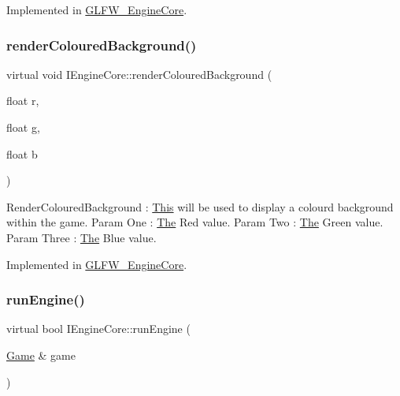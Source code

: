 Implemented in \mbox{\hyperlink{class_g_l_f_w___engine_core_aa786131ec64e7ee6779c3ac1ee8507ce}{G\+L\+F\+W\+\_\+\+Engine\+Core}}.

\mbox{\label{class_i_engine_core_a8f8e0778f04c50b680cdde167cb38e2f}} 
\subsubsection{\texorpdfstring{render\+Coloured\+Background()}{renderColouredBackground()}}
{\footnotesize\ttfamily virtual void I\+Engine\+Core\+::render\+Coloured\+Background (\begin{DoxyParamCaption}\item[{float}]{r,  }\item[{float}]{g,  }\item[{float}]{b }\end{DoxyParamCaption})\hspace{0.3cm}{\ttfamily [pure virtual]}}

Render\+Coloured\+Background \+: \mbox{\hyperlink{class_this}{This}} will be used to display a colourd background within the game. Param One \+: \mbox{\hyperlink{class_the}{The}} Red value. Param Two \+: \mbox{\hyperlink{class_the}{The}} Green value. Param Three \+: \mbox{\hyperlink{class_the}{The}} Blue value. 

Implemented in \mbox{\hyperlink{class_g_l_f_w___engine_core_a6031a54b0978d6e0fd1be3f292c2059f}{G\+L\+F\+W\+\_\+\+Engine\+Core}}.

\mbox{\label{class_i_engine_core_ad03940f571ec20ba7427feeca44ace21}} 
\subsubsection{\texorpdfstring{run\+Engine()}{runEngine()}}
{\footnotesize\ttfamily virtual bool I\+Engine\+Core\+::run\+Engine (\begin{DoxyParamCaption}\item[{\mbox{\hyperlink{class_game}{Game}} \&}]{game }\end{DoxyParamCaption})\hspace{0.3cm}{\ttfamily [pure virtual]}}

